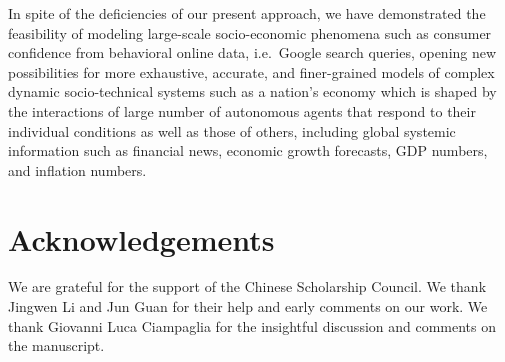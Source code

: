 \documentclass[10pt]{article}
\begin{document}
In spite of the deficiencies of our present approach, we have demonstrated the feasibility of modeling large-scale socio-economic phenomena such as consumer confidence from behavioral online data, i.e.~Google search queries, opening new possibilities for more exhaustive, accurate, and finer-grained models of complex dynamic socio-technical systems such as a nation's economy which is shaped by the interactions of large number of autonomous agents that respond to their individual conditions as well as those of others, including global systemic information such as financial news, economic growth forecasts, GDP numbers, and inflation numbers.

\section*{Acknowledgements}

We are grateful for the support of the Chinese Scholarship Council. We thank Jingwen Li and Jun Guan for their help and early comments on our work.  We thank Giovanni Luca Ciampaglia for the insightful discussion and comments on the manuscript.
\end{document}
